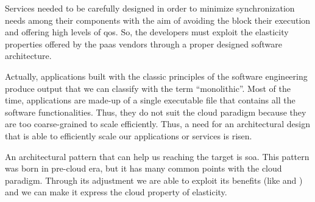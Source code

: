 Services needed to be carefully designed in order to minimize synchronization needs among their components
with the aim of avoiding the block their execution and offering high levels of \ac{qos}. So, the
developers must exploit the elasticity properties offered by the \ac{paas} vendors through a proper
designed software architecture.

Actually, applications built with the classic principles of the software engineering produce output 
that we can classify with the term ``monolithic''. Most of the time, applications are made-up of a
single executable file that contains all the software functionalities. Thus, they do not suit the cloud
paradigm because they are too coarse-grained to scale efficiently. Thus, a need for an architectural 
design that is able to efficiently scale our applications or services is risen.

An architectural pattern that can help us reaching the target is \acf{soa}. This pattern was born in 
pre-cloud era, but it has many common points with the cloud paradigm. Through its adjustment we are
able to exploit its benefits (like  and ) and we can make
it express the cloud property of elasticity.